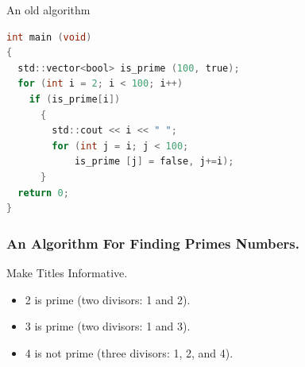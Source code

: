 \documentclass[ucs,8pt]{beamer}
\begin{document}

\begin{frame}[fragile]{An old algorithm}
\begin{lstlisting}[language=C]
int main (void)
{
  std::vector<bool> is_prime (100, true);
  for (int i = 2; i < 100; i++)
    if (is_prime[i])
      {
        std::cout << i << " ";
        for (int j = i; j < 100;
            is_prime [j] = false, j+=i);
      }
  return 0;
}
\end{lstlisting}
\end{frame}

\begin{frame}[fragile]
  \frametitle{An Algorithm For Finding Primes Numbers.}
\begin{semiverbatim}
\end{semiverbatim}
\end{frame}


\begin{frame}{Make Titles Informative.}
  \begin{example}
    \begin{itemize}
    \item 2 is prime (two divisors: 1 and 2).
    \item 3 is prime (two divisors: 1 and 3).
    \item 4 is not prime (\alert{three} divisors: 1, 2, and 4).
    \end{itemize}
  \end{example}
\end{frame}
\end{document}
